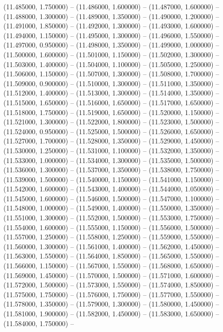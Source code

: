 (11.485000, 1.750000) -- 
(11.486000, 1.600000) -- 
(11.487000, 1.600000) -- 
(11.488000, 1.300000) -- 
(11.489000, 1.350000) -- 
(11.490000, 1.200000) -- 
(11.491000, 1.850000) -- 
(11.492000, 1.300000) -- 
(11.493000, 1.600000) -- 
(11.494000, 1.150000) -- 
(11.495000, 1.300000) -- 
(11.496000, 1.550000) -- 
(11.497000, 0.950000) -- 
(11.498000, 1.350000) -- 
(11.499000, 1.000000) -- 
(11.500000, 1.600000) -- 
(11.501000, 1.150000) -- 
(11.502000, 1.300000) -- 
(11.503000, 1.400000) -- 
(11.504000, 1.100000) -- 
(11.505000, 1.250000) -- 
(11.506000, 1.150000) -- 
(11.507000, 1.300000) -- 
(11.508000, 1.700000) -- 
(11.509000, 0.900000) -- 
(11.510000, 1.300000) -- 
(11.511000, 1.350000) -- 
(11.512000, 1.400000) -- 
(11.513000, 1.300000) -- 
(11.514000, 1.350000) -- 
(11.515000, 1.650000) -- 
(11.516000, 1.650000) -- 
(11.517000, 1.650000) -- 
(11.518000, 1.750000) -- 
(11.519000, 1.650000) -- 
(11.520000, 1.150000) -- 
(11.521000, 1.300000) -- 
(11.522000, 1.800000) -- 
(11.523000, 1.500000) -- 
(11.524000, 0.950000) -- 
(11.525000, 1.500000) -- 
(11.526000, 1.650000) -- 
(11.527000, 1.700000) -- 
(11.528000, 1.350000) -- 
(11.529000, 1.450000) -- 
(11.530000, 1.250000) -- 
(11.531000, 1.100000) -- 
(11.532000, 1.350000) -- 
(11.533000, 1.000000) -- 
(11.534000, 1.300000) -- 
(11.535000, 1.500000) -- 
(11.536000, 1.300000) -- 
(11.537000, 1.350000) -- 
(11.538000, 1.750000) -- 
(11.539000, 1.500000) -- 
(11.540000, 1.150000) -- 
(11.541000, 1.150000) -- 
(11.542000, 1.600000) -- 
(11.543000, 1.400000) -- 
(11.544000, 1.050000) -- 
(11.545000, 1.600000) -- 
(11.546000, 1.500000) -- 
(11.547000, 1.100000) -- 
(11.548000, 1.000000) -- 
(11.549000, 1.400000) -- 
(11.550000, 1.350000) -- 
(11.551000, 1.300000) -- 
(11.552000, 1.500000) -- 
(11.553000, 1.750000) -- 
(11.554000, 1.600000) -- 
(11.555000, 1.150000) -- 
(11.556000, 1.500000) -- 
(11.557000, 1.250000) -- 
(11.558000, 1.250000) -- 
(11.559000, 1.550000) -- 
(11.560000, 1.300000) -- 
(11.561000, 1.400000) -- 
(11.562000, 1.450000) -- 
(11.563000, 1.550000) -- 
(11.564000, 1.850000) -- 
(11.565000, 1.550000) -- 
(11.566000, 1.150000) -- 
(11.567000, 1.550000) -- 
(11.568000, 1.650000) -- 
(11.569000, 1.450000) -- 
(11.570000, 1.500000) -- 
(11.571000, 1.600000) -- 
(11.572000, 1.500000) -- 
(11.573000, 1.550000) -- 
(11.574000, 1.850000) -- 
(11.575000, 1.750000) -- 
(11.576000, 1.750000) -- 
(11.577000, 1.550000) -- 
(11.578000, 1.350000) -- 
(11.579000, 1.300000) -- 
(11.580000, 1.450000) -- 
(11.581000, 1.900000) -- 
(11.582000, 1.450000) -- 
(11.583000, 1.650000) -- 
(11.584000, 1.750000) -- 
